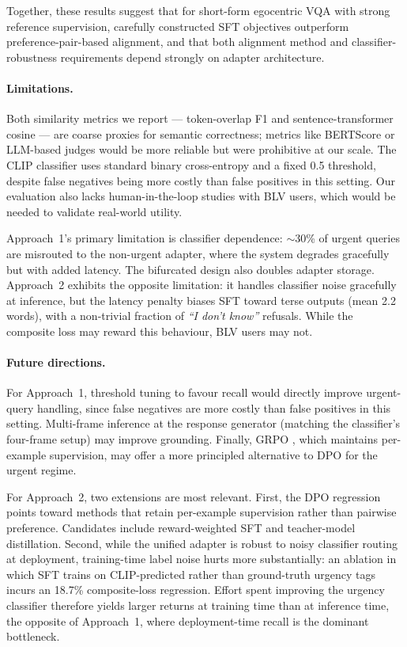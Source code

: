 \documentclass{article}
\begin{document}
Together, these results suggest that for short-form egocentric VQA with strong reference supervision, carefully constructed SFT objectives outperform preference-pair-based alignment, and that both alignment method and classifier-robustness requirements depend strongly on adapter architecture.

\paragraph{Limitations.}
Both similarity metrics we report --- token-overlap F1 and sentence-transformer cosine --- are coarse proxies for semantic correctness; metrics like BERTScore or LLM-based judges would be more reliable but were prohibitive at our scale. The CLIP classifier uses standard binary cross-entropy and a fixed 0.5 threshold, despite false negatives being more costly than false positives in this setting. Our evaluation also lacks human-in-the-loop studies with BLV users, which would be needed to validate real-world utility.

Approach~1's primary limitation is classifier dependence: $\sim$30\% of urgent queries are misrouted to the non-urgent adapter, where the system degrades gracefully but with added latency. The bifurcated design also doubles adapter storage. Approach~2 exhibits the opposite limitation: it handles classifier noise gracefully at inference, but the latency penalty biases SFT toward terse outputs (mean 2.2 words), with a non-trivial fraction of \textit{``I don't know''} refusals. While the composite loss may reward this behaviour, BLV users may not.

\paragraph{Future directions.}
For Approach~1, threshold tuning to favour recall would directly improve urgent-query handling, since false negatives are more costly than false positives in this setting. Multi-frame inference at the response generator (matching the classifier's four-frame setup) may improve grounding. Finally, GRPO \cite{shao2024deepseekmath}, which maintains per-example supervision, may offer a more principled alternative to DPO for the urgent regime.

For Approach~2, two extensions are most relevant. First, the DPO regression points toward methods that retain per-example supervision rather than pairwise preference. Candidates include reward-weighted SFT and teacher-model distillation. Second, while the unified adapter is robust to noisy classifier routing at deployment, training-time label noise hurts more substantially: an ablation in which SFT trains on CLIP-predicted rather than ground-truth urgency tags incurs an 18.7\% composite-loss regression. Effort spent improving the urgency classifier therefore yields larger returns at training time than at inference time, the opposite of Approach~1, where deployment-time recall is the dominant bottleneck.
\end{document}
